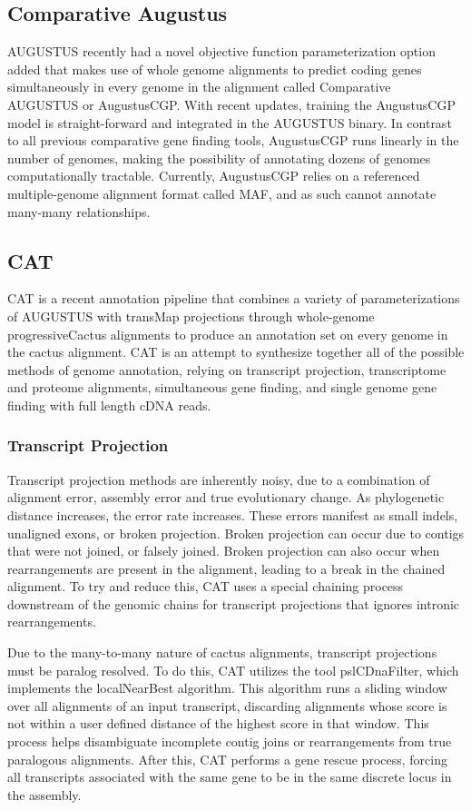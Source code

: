 \documentclass[fleqn,10pt]{wlscirep}
\begin{document}
\subsection{Comparative Augustus}
AUGUSTUS recently had a novel objective function parameterization option added that makes use of whole genome alignments to predict coding genes simultaneously in every genome in the alignment \cite{konig2015simultaneous} called Comparative AUGUSTUS or AugustusCGP. With recent updates, training the AugustusCGP model is straight-forward and integrated in the AUGUSTUS binary. In contrast to all previous comparative gene finding tools, AugustusCGP runs linearly in the number of genomes, making the possibility of annotating dozens of genomes computationally tractable. Currently, AugustusCGP relies on a referenced multiple-genome alignment format called MAF, and as such cannot annotate many-many relationships.

\subsection{CAT}
CAT is a recent annotation pipeline that combines a variety of parameterizations of AUGUSTUS with transMap projections through whole-genome progressiveCactus alignments to produce an annotation set on every genome in the cactus alignment. CAT is an attempt to synthesize together all of the possible methods of genome annotation, relying on transcript projection, transcriptome and proteome alignments, simultaneous gene finding, and single genome gene finding with full length cDNA reads. 

\subsubsection{Transcript Projection}
Transcript projection methods are inherently noisy, due to a combination of alignment error, assembly error and true evolutionary change. As phylogenetic distance increases, the error rate increases. These errors manifest as small indels, unaligned exons, or broken projection. Broken projection can occur due to contigs that were not joined, or falsely joined. Broken projection can also occur when rearrangements are present in the alignment, leading to a break in the chained alignment. To try and reduce this, CAT uses a special chaining process downstream of the genomic chains for transcript projections that ignores intronic rearrangements.

Due to the many-to-many nature of cactus alignments, transcript projections must be paralog resolved. To do this, CAT utilizes the tool pslCDnaFilter, which implements the localNearBest algorithm. This algorithm runs a sliding window over all alignments of an input transcript, discarding alignments whose score is not within a user defined distance of the highest score in that window. This process helps disambiguate incomplete contig joins or rearrangements from true paralogous alignments. After this, CAT performs a gene rescue process, forcing all transcripts associated with the same gene to be in the same discrete locus in the assembly.
\end{document}
